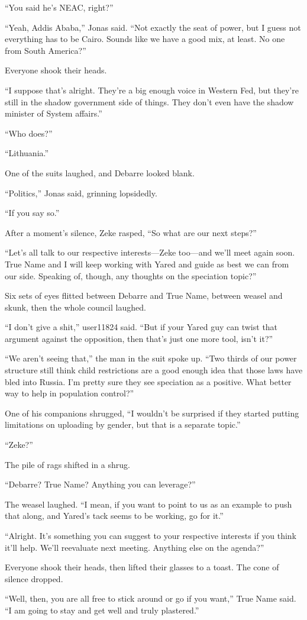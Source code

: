``You said he's NEAC, right?''

``Yeah, Addis Ababa,'' Jonas said. ``Not exactly the seat of power, but I guess not everything has to be Cairo. Sounds like we have a good mix, at least. No one from South America?''

Everyone shook their heads.

``I suppose that's alright. They're a big enough voice in Western Fed, but they're still in the shadow government side of things. They don't even have the shadow minister of System affairs.''

``Who does?''

``Lithuania.''

One of the suits laughed, and Debarre looked blank.

``Politics,'' Jonas said, grinning lopsidedly.

``If you say so.''

After a moment's silence, Zeke rasped, ``So what are our next steps?''

``Let's all talk to our respective interests---Zeke too---and we'll meet again soon. True Name and I will keep working with Yared and guide as best we can from our side. Speaking of, though, any thoughts on the speciation topic?''

Six sets of eyes flitted between Debarre and True Name, between weasel and skunk, then the whole council laughed.

``I don't give a shit,'' user11824 said. ``But if your Yared guy can twist that argument against the opposition, then that's just one more tool, isn't it?''

``We aren't seeing that,'' the man in the suit spoke up. ``Two thirds of our power structure still think child restrictions are a good enough idea that those laws have bled into Russia. I'm pretty sure they see speciation as a positive. What better way to help in population control?''

One of his companions shrugged, ``I wouldn't be surprised if they started putting limitations on uploading by gender, but that is a separate topic.''

``Zeke?''

The pile of rags shifted in a shrug.

``Debarre? True Name? Anything you can leverage?''

The weasel laughed. ``I mean, if you want to point to us as an example to push that along, and Yared's tack seems to be working, go for it.''

``Alright. It's something you can suggest to your respective interests if you think it'll help. We'll reevaluate next meeting. Anything else on the agenda?''

Everyone shook their heads, then lifted their glasses to a toast. The cone of silence dropped.

``Well, then, you are all free to stick around or go if you want,'' True Name said. ``I am going to stay and get well and truly plastered.''

